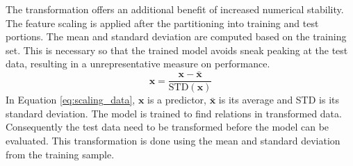 The transformation offers an additional benefit of increased numerical stability. %
The feature scaling is applied after the partitioning into training and test portions. The mean and standard deviation are computed based on the training set. This is necessary so that the trained model avoids sneak peaking at the test data, resulting in a unrepresentative measure on performance.
\begin{equation} \label{eq:scaling_data}
    \mathbf{x} = \frac{\mathbf{x} - \bar{\mathbf{x}}}{\text{STD}(\mathbf{x})}
\end{equation}
In Equation \eqref{eq:scaling_data}, $\mathbf{x}$ is a predictor,  $\bar{\mathbf{x}}$ is its average and STD is its standard deviation. The model is trained to find relations in transformed data. Consequently the test data need to be transformed before the model can be evaluated. This transformation is done using the mean and standard deviation from the training sample.


